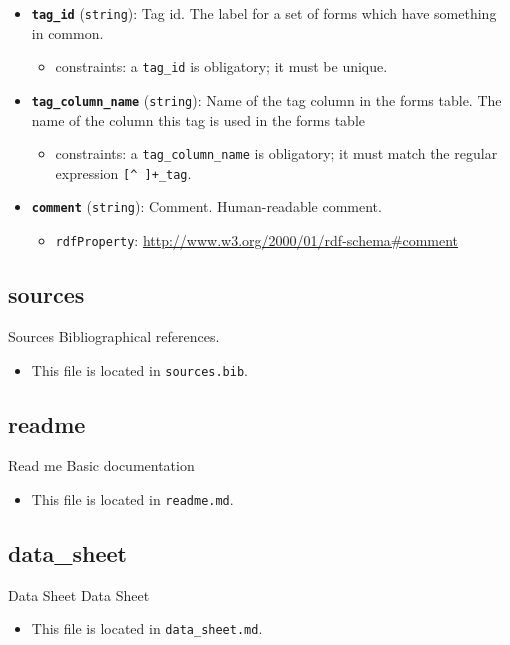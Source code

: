\begin{itemize}
\item
  \textbf{\texttt{tag\_id}} (\texttt{string}): Tag id. The label for a
  set of forms which have something in common.

  \begin{itemize}
  \tightlist
  \item
    constraints: a \texttt{tag\_id} is obligatory; it must be unique.
  \end{itemize}
\item
  \textbf{\texttt{tag\_column\_name}} (\texttt{string}): Name of the tag
  column in the forms table. The name of the column this tag is used in
  the forms table

  \begin{itemize}
  \tightlist
  \item
    constraints: a \texttt{tag\_column\_name} is obligatory; it must
    match the regular expression \texttt{{[}\^{}\ {]}+\_tag}.
  \end{itemize}
\item
  \textbf{\texttt{comment}} (\texttt{string}): Comment. Human-readable
  comment.

  \begin{itemize}
  \tightlist
  \item
    \texttt{rdfProperty}:
    \url{http://www.w3.org/2000/01/rdf-schema\#comment}
  \end{itemize}
\end{itemize}

\hypertarget{sources}{%
\subsection{\texorpdfstring{\textbf{sources}}{sources}}\label{sources}}

Sources\textbar{} Bibliographical references.

\begin{itemize}
\tightlist
\item
  This file is located in \texttt{sources.bib}.
\end{itemize}

\hypertarget{readme}{%
\subsection{\texorpdfstring{\textbf{readme}}{readme}}\label{readme}}

Read me\textbar{} Basic documentation

\begin{itemize}
\tightlist
\item
  This file is located in \texttt{readme.md}.
\end{itemize}

\hypertarget{data_sheet}{%
\subsection{\texorpdfstring{\textbf{data\_sheet}}{data\_sheet}}\label{data_sheet}}

Data Sheet\textbar{} Data Sheet

\begin{itemize}
\tightlist
\item
  This file is located in \texttt{data\_sheet.md}.
\end{itemize}
